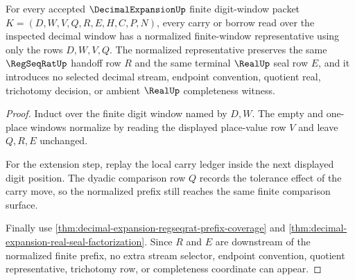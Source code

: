 \begin{theorem}
\label{thm:decimal-expansion-carry-normalization-totality}
For every accepted $\DecimalExpansionUp$ finite digit-window packet $K=(D,W,V,Q,R,E,H,C,P,N)$, every carry or borrow read over the inspected decimal window has a normalized finite-window representative using only the rows $D,W,V,Q$. The normalized representative preserves the same $\RegSeqRatUp$ handoff row $R$ and the same terminal $\RealUp$ seal row $E$, and it introduces no selected decimal stream, endpoint convention, quotient real, trichotomy decision, or ambient $\RealUp$ completeness witness.
\end{theorem}
\begin{proof}
Induct over the finite digit window named by $D,W$. The empty and one-place windows normalize by reading the displayed place-value row $V$ and leave $Q,R,E$ unchanged.

For the extension step, replay the local carry ledger inside the next displayed digit position. The dyadic comparison row $Q$ records the tolerance effect of the carry move, so the normalized prefix still reaches the same finite comparison surface.

Finally use \autoref{thm:decimal-expansion-regseqrat-prefix-coverage} and \autoref{thm:decimal-expansion-real-seal-factorization}. Since $R$ and $E$ are downstream of the normalized finite prefix, no extra stream selector, endpoint convention, quotient representative, trichotomy row, or completeness coordinate can appear.
\end{proof}

